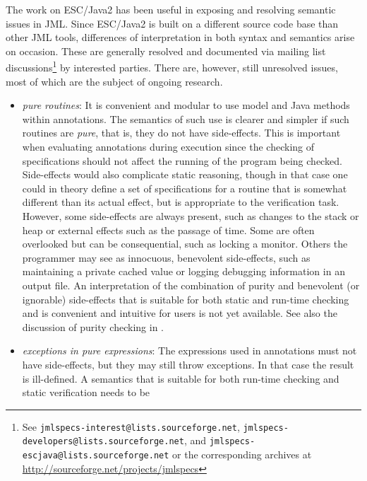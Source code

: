 \documentclass{sig-alternate}
\begin{document}
The work on ESC/Java2 has been useful in exposing and resolving
semantic issues in JML.  Since ESC/Java2 is built on a different
source code base than other JML tools, differences of interpretation
in both syntax and semantics arise on occasion.  These are generally
resolved and documented via mailing list discussions\footnote{See \texttt{jmlspecs-interest@lists.sourceforge.net}, 
\texttt{jmlspecs-developers@lists.sourceforge.net}, and
\texttt{jmlspecs-escjava@lists.sourceforge.net} or the corresponding archives at \url{http://sourceforge.net/projects/jmlspecs}}
by interested
parties.  There are, however, still unresolved issues, most of which
are the subject of ongoing research.
\setlength{\partopsep}{0in}\setlength{\parskip}{0in}\setlength{\itemsep}{0in}\setlength{\topsep}{0in}
\begin{itemize}
\setlength{\partopsep}{0in}\setlength{\parskip}{0in}\setlength{\itemsep}{0in}\setlength{\topsep}{0in}
\item \textit{pure routines}:  It is convenient and modular to use model and Java methods within
annotations.  The semantics of such use is clearer and simpler if such routines are {\em pure}, that is, they do not have side-effects.  This is important when evaluating annotations during
execution since the checking of specifications should not affect the running of the program being
checked.  Side-effects would also complicate static reasoning, though in that case one could 
in theory define a set of specifications for a routine that is somewhat different than its actual effect, but is
appropriate to the verification task.   However, some side-effects are
always present, such as changes to the stack or heap or external effects such as the passage of time.  Some are often overlooked but can be consequential, such as locking a monitor. 
 Others the programmer may
see as innocuous, benevolent side-effects, such as maintaining a private cached value or logging debugging information in an output file.
An interpretation of the combination of purity and benevolent (or ignorable)
  side-effects that is suitable for both static and run-time checking and is convenient and intuitive
for users is not yet available. See also the discussion of purity checking in \cite{Leavens-etal03a}.
\item \textit{exceptions in pure expressions}:  The expressions used in annotations must not have
side-effects, but they may still throw exceptions.  In that case the result is ill-defined.  A
semantics that is suitable for both run-time checking and static verification needs to be 

\end{itemize}
\end{document}
